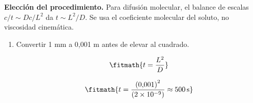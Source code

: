 \noindent\textbf{Elección del procedimiento.} Para difusión molecular, el balance de escalas $c/t\sim D c/L^2$ da $t\sim L^2/D$. Se usa el coeficiente molecular del soluto, no viscosidad cinemática.

\begin{enumerate}

\item Convertir 1 mm a 0,001 m antes de elevar al cuadrado.

\[\fitmath{t=\frac{{L}^{2}}{D}}\]

\[\fitmath{t=\frac{{(0{,}001)}^{2}}{(2\times10^{-9})}\approx 500\,\mathrm{s}}\]

\end{enumerate}
